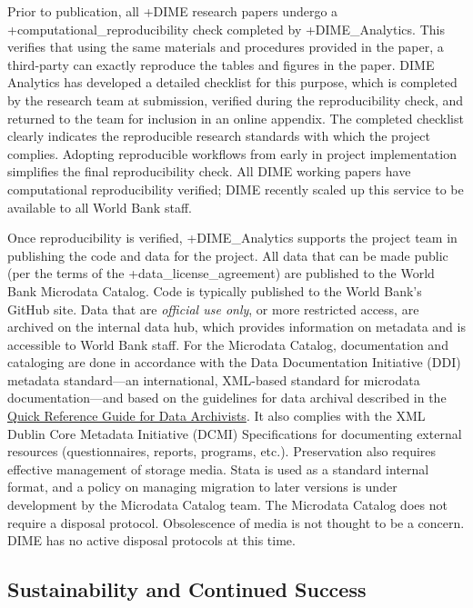 \documentclass[
]{WileySix}
\begin{document}
Prior to publication, all +DIME\textbar{} research papers undergo a +computational\_reproducibility\textbar{} check completed by +DIME\_Analytics\textbar. This verifies that using the same materials and procedures provided in the paper, a third-party can exactly reproduce the tables and figures in the paper. DIME Analytics has developed a detailed checklist for this purpose, which is completed by the research team at submission, verified during the reproducibility check, and returned to the team for inclusion in an online appendix. The completed checklist clearly indicates the reproducible research standards with which the project complies. Adopting reproducible workflows from early in project implementation simplifies the final reproducibility check. All DIME working papers have computational reproducibility verified; DIME recently scaled up this service to be available to all World Bank staff.

Once reproducibility is verified, +DIME\_Analytics\textbar{} supports the project team in publishing the code and data for the project. All data that can be made public (per the terms of the +data\_license\_agreement\textbar) are published to the World Bank Microdata Catalog. Code is typically published to the World Bank's GitHub site. Data that are \emph{official use only}, or more restricted access, are archived on the internal data hub, which provides information on metadata and is accessible to World Bank staff. For the Microdata Catalog, documentation and cataloging are done in accordance with the Data Documentation Initiative (DDI) metadata standard---an international, XML-based standard for microdata documentation---and based on the guidelines for data archival described in the \href{https://guide-for-data-archivists.readthedocs.io/en/latest/}{Quick Reference Guide for Data Archivists}. It also complies with the XML Dublin Core Metadata Initiative (DCMI) Specifications for documenting external resources (questionnaires, reports, programs, etc.). Preservation also requires effective management of storage media. Stata is used as a standard internal format, and a policy on managing migration to later versions is under development by the Microdata Catalog team. The Microdata Catalog does not require a disposal protocol. Obsolescence of media is not thought to be a concern. DIME has no active disposal protocols at this time.

\hypertarget{sustainability-and-continued-success-7}{%
\subsection{Sustainability and Continued Success}\label{sustainability-and-continued-success-7}}
\end{document}
